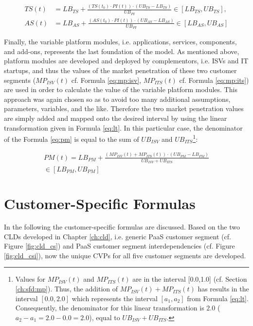 \begin{align}
	TS(t) &= LB_{TS} +  \frac{(TS(t_0) \cdot PI(t)) \cdot (UB_{TS} - LB_{TS})}{UB_{PI}} \in [LB_{TS},UB_{TS}],\label{eq:ts}\\
	AS(t) &= LB_{AS} +  \frac{(AS(t_0) \cdot PI(t)) \cdot (UB_{AS} - LB_{AS})}{UB_{PI}} \in [LB_{AS},UB_{AS}]\label{eq:as}
\end{align} 

Finally, the variable platform modules, i.e. applications, services, components, and add-ons, represents the last foundation of the model. As mentioned above, platform modules are developed and deployed by complementors, i.e. \acp{ISV} and \ac{IT} startups, and thus the values of the market penetration of these two customer segments ($MP_{ISV}(t)$ cf. Formula \ref{eq:mp:isv}, $MP_{ITS}(t)$ cf. Formula \ref{eq:mp:its}) are used in order to calculate the value of the variable platform modules. This approach was again chosen so as to avoid too many additional assumptions, parameters, variables, and the like. Therefore the two market penetration values are simply added and mapped onto the desired interval by using the linear transformation given in Formula \ref{eq:lt}. In this particular case, the denominator of the Formula \ref{eq:pm} is equal to the sum of $UB_{ISV}$ and $UB_{ITS}$\footnote{Values for $MP_{ISV}(t)$ and $MP_{ITS}(t)$ are in the interval [0.0,1.0] (cf. Section \ref{ch:sfd:mp}). Thus, the addition of $MP_{ISV}(t) + MP_{ITS}(t)$ has results in the interval $[0.0,2.0]$ which represents the interval $[a_1,a_2]$ from Formula \ref{eq:lt}. Consequently, the denominator for this linear transformation is $2.0$ ($a_2 - a_1 = 2.0 - 0.0 = 2.0$), equal to $UB_{ISV} + UB_{ITS}$.}:

\begin{eqnarray}\label{eq:pm}
	PM(t) = LB_{PM} + \frac{(MP_{ISV}(t) + MP_{ITS}(t)) \cdot (UB_{PM} - LB_{PM})}{UB_{ISV} + UB_{ITS}} \nonumber \\ \in [LB_{PM},UB_{PM}]
\end{eqnarray}

\section{Customer-Specific Formulas}\label{ch:sfd:csf}

In the following the customer-specific formulas are discussed. Based on the two \acp{CLD} developed in Chapter \ref{ch:cld}, i.e. generic \ac{PaaS} customer segment (cf. Figure \ref{fig:cld_cs}) and \ac{PaaS} customer segment interdependencies (cf. Figure \ref{fig:cld_csi}), now the unique \acp{CVP} for all five customer segments are developed.

